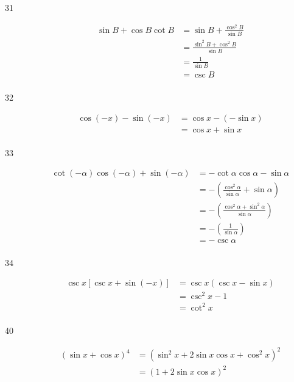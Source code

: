 \documentclass{exam}
\begin{document}
\begin{description}
      \item[31] 
        \begin{align*}
          \sin B + \cos B \cot B & = \sin B + \frac{\cos^2 B}{\sin B} \\
                                 & = \frac{\sin^2 B + \cos^2 B}{\sin B} \\
                                 & = \frac{1}{\sin B} \\
                                 & = \csc B \\
        \end{align*}

      \item[32] 
        \begin{align*}
          \cos(-x) - \sin(-x) & = \cos x - (- \sin x) \\
                              & = \cos x + \sin x \\
        \end{align*}

      \item[33] 
        \begin{align*}
          \cot(- \alpha) \cos(- \alpha) + \sin(-\alpha) & = - \cot \alpha \cos \alpha - \sin \alpha \\
                                                        & = - \left( \frac{\cos^2 \alpha}{\sin \alpha} + \sin \alpha \right) \\
                                                        & = - \left( \frac{\cos^2 \alpha + \sin^2 \alpha}{\sin \alpha} \right) \\
                                                        & = - \left( \frac{1}{\sin \alpha} \right) \\
                                                        & = - \csc \alpha \\
        \end{align*}

      \item[34] 
        \begin{align*}
          \csc x [\csc x + \sin(-x)] & = \csc x (\csc x - \sin x) \\
                                     & = \csc^2 x - 1 \\
                                     & = \cot^2 x \\
        \end{align*}

      \item[40] 
        \begin{align*}
          (\sin x + \cos x)^4 & = \left( \sin^2 x + 2 \sin x \cos x + \cos^2 x \right)^2 \\
                              & = ( 1 + 2 \sin x \cos x )^2 \\
        \end{align*}


\end{description}
\end{document}
